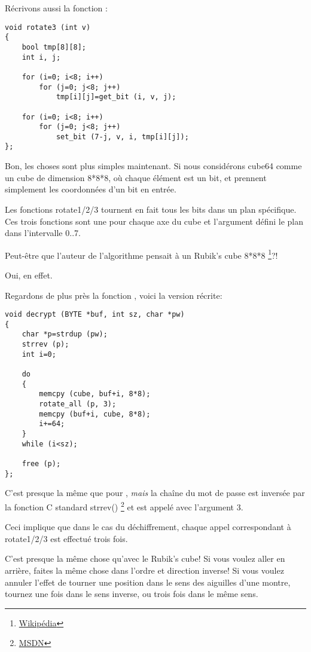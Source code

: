 Récrivons aussi la fonction :

\begin{lstlisting}[style=customc]
void rotate3 (int v)
{
	bool tmp[8][8];
	int i, j;

	for (i=0; i<8; i++)
		for (j=0; j<8; j++)
			tmp[i][j]=get_bit (i, v, j);

	for (i=0; i<8; i++)
		for (j=0; j<8; j++)
			set_bit (7-j, v, i, tmp[i][j]);
};
\end{lstlisting}

Bon, les choses sont plus simples maintenant. Si nous considérons cube64 comme un
cube de dimension 8*8*8, où chaque élément est un bit,  et 
prennent simplement les coordonnées d'un bit en entrée.

Les fonctions rotate1/2/3 tournent en fait tous les bits dans un plan spécifique.
Ces trois fonctions sont une pour chaque axe du cube et l'argument  défini
le plan dans l'intervalle 0..7.

Peut-être que l'auteur de l'algorithme pensait à un Rubik's cube 8*8*8
\footnote{\href{http://go.yurichev.com/17115}{Wikipédia}}?!

Oui, en effet.

Regardons de plus près la fonction , voici la version récrite:

\begin{lstlisting}[style=customc]
void decrypt (BYTE *buf, int sz, char *pw)
{
	char *p=strdup (pw);
	strrev (p);
	int i=0;

	do
	{
		memcpy (cube, buf+i, 8*8);
		rotate_all (p, 3);
		memcpy (buf+i, cube, 8*8);
		i+=64;
	}
	while (i<sz);
	
	free (p);
};
\end{lstlisting}

C'est presque la même que pour , \emph{mais} la chaîne du mot de passe
est inversée par la fonction C standard strrev() \footnote{\href{http://go.yurichev.com/17249}{MSDN}}
et  est appelé avec l'argument 3.

Ceci implique que dans le cas du déchiffrement, chaque appel correspondant à rotate1/2/3
est effectué trois fois.

C'est presque la même chose qu'avec le Rubik's cube!
Si vous voulez aller en arrière, faites la même chose dans l'ordre et direction inverse!
Si vous voulez annuler l'effet de tourner une position dans le sens des aiguilles
d'une montre, tournez une fois dans le sens inverse, ou trois fois dans le même sens.

